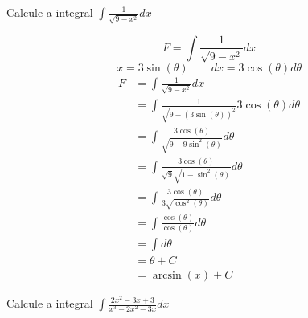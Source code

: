 \documentclass[a4paper,12pt,fleqn]{article}
\begin{document}
Calcule a integral
\(
  \int \frac{1}{\sqrt{9-x^2}} dx
\)

\begin{answer}
  \[
    F = \int \frac{1}{\sqrt{9-x^2}} dx
  \]
  \[
    x = 3\sin(\theta) \qquad dx = 3\cos(\theta) d\theta
  \]
  \begin{align*}
    F
    & = \int \frac{1}{\sqrt{9-x^2}} dx \\[2mm]
    & = \int \frac{1}{\sqrt{9-\left(3\sin(\theta)\right)^2}}  3\cos(\theta) d\theta \\[2mm]
    & = \int \frac{3\cos(\theta)}{\sqrt{9-9\sin^2(\theta)}} d\theta \\[2mm]
    & = \int \frac{3\cos(\theta)}{\sqrt{9}\sqrt{1-\sin^2(\theta)}} d\theta \\[2mm]
    & = \int \frac{3\cos(\theta)}{3\sqrt{\cos^2(\theta)}} d\theta \\[2mm]
    & = \int \frac{\cos(\theta)}{\cos(\theta)} d\theta\\[2mm]
    & = \int d\theta \\[2mm]
    & = \theta + C\\[2mm]
    & = \arcsin(x) + C
  \end{align*}
  \clearpage
\end{answer}

Calcule a integral
\(
  \int \frac{2x^2 -3 x + 3}{x^3-2x^2-3x} dx
\)
\end{document}
